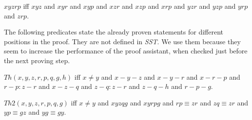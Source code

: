 \documentclass[10pt,a4paper,parskip=half,numbers=endperiod,headings=standardclasses,parskip]{scrbook}
\newcommand{\Cong}[4]{#1 #2 \equiv #3 #4}
\newcommand{\Betw}[3]{#1 #2 #3}
\newcommand{\BetwFive}[5]{#1 #2 #3 #4 #5}
\newcommand{\OFS}[8]{\operatorname{OFS}
\left(\begin{smallmatrix}%
#1 & #2 & #3 & #4 \\
#5 & #6 & #7 & #8
\end{smallmatrix}\right)%
}
\newcommand{\IFS}[8]{\operatorname{IFS}
\left(\begin{smallmatrix}%
#1 & #2 & #3 & #4 \\
#5 & #6 & #7 & #8
\end{smallmatrix}\right)%
}
\begin{document}

  \begin{forthel}
    \begin{definition} %
      $\BetwFive{x}{y}{z}{r}{p}$ iff $\Betw{x}{y}{z}$ and
      $\Betw{x}{y}{r}$ and
      $\Betw{x}{y}{p}$ and
      $\Betw{x}{z}{r}$ and
      $\Betw{x}{z}{p}$ and
      $\Betw{x}{r}{p}$ and
      $\Betw{y}{z}{r}$ and
      $\Betw{y}{z}{p}$ and
      $\Betw{y}{r}{p}$ and
      $\Betw{z}{r}{p}$.
    \end{definition}
  \end{forthel}

  The following predicates state the already proven statements for different positions in the proof.
  They are not defined in \textit{SST}.
  We use them because they seem to increase the performance of the proof assistant,
  when checked just before the next proving step.

  \begin{forthel}
    \begin{definition} %
      $Th(x,y,z,r,p,q,g,h)$ iff $x \neq y$ and $x-y-z$ and $x-y-r$ and $x-r-p$ and $r-p : z-r$ and $x-z-q$ and $z-q : z-r$ and $z-q-h$ and $r-p-g$.
    \end{definition}

    \begin{definition} %
      $Th2(x,y,z,r,p,q,g)$ iff $x \neq y$ and
      $\BetwFive{x}{y}{z}{q}{g}$ and
      $\BetwFive{x}{y}{r}{p}{g}$ and
      $\Cong{r}{p}{z}{r}$ and
      $\Cong{z}{q}{z}{r}$ and
      $\Cong{y}{p}{g}{z}$ and
      $\Cong{y}{g}{g}{y}$.
    \end{definition}


  \end{forthel}
\end{document}
